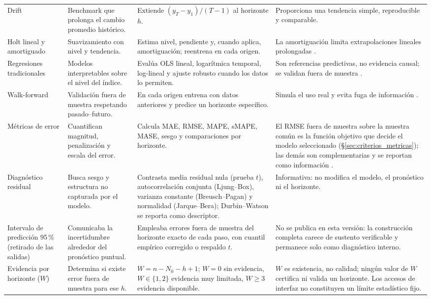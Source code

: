 \documentclass[12pt,letterpaper]{article}
\providecommand{\parencite}{\citep}
\begin{document}
\begin{landscape}
\begin{table}[H]
\begin{adjustbox}{max width=\linewidth,max totalheight=0.84\textheight}
\begin{tabularx}{\linewidth}{@{}p{3.1cm}YYY@{}}
Drift & Benchmark que prolonga el cambio promedio histórico. & Extiende \((y_T-y_1)/(T-1)\) al horizonte \(h\). & Proporciona una tendencia simple, reproducible y comparable. \\
Holt lineal y amortiguado & Suavizamiento con nivel y tendencia. & Estima nivel, pendiente y, cuando aplica, amortiguación; reentrena en cada origen. & La amortiguación limita extrapolaciones lineales prolongadas \parencite{holt1957,gardner_mckenzie1985}. \\
Regresiones tradicionales & Modelos interpretables sobre el nivel del índice. & Evalúa OLS lineal, logarítmica temporal, log-lineal y ajuste robusto cuando los datos lo permiten. & Son referencias predictivas, no evidencia causal; se validan fuera de muestra \parencite{granger_newbold1974,huber1964}. \\
Walk-forward & Validación fuera de muestra respetando pasado--futuro. & En cada origen entrena con datos anteriores y predice un horizonte específico. & Simula el uso real y evita fuga de información \parencite{tashman2000}. \\
Métricas de error & Cuantifican magnitud, penalización y escala del error. & Calcula MAE, RMSE, MAPE, sMAPE, MASE, sesgo y comparaciones por horizonte. & El RMSE fuera de muestra sobre la muestra común es la función objetivo que decide el modelo seleccionado (§\ref{sec:criterios_metricas}); las demás son complementarias y se reportan como información \parencite{hyndman_koehler2006}. \\
Diagnóstico residual & Busca sesgo y estructura no capturada por el modelo. & Contrasta media residual nula (prueba \(t\)), autocorrelación conjunta (Ljung--Box), varianza constante (Breusch--Pagan) y normalidad (Jarque--Bera); Durbin--Watson se reporta como descriptor. & Informativa: no modifica el modelo, el pronóstico ni el horizonte. \\
Intervalo de predicción 95\,\% (retirado de las salidas) & Comunicaba la incertidumbre alrededor del pronóstico puntual. & Empleaba errores fuera de muestra del horizonte exacto de cada paso, con cuantil empírico corregido o respaldo $t$. & No se publica en esta versión: la construcción completa carece de sustento verificable y permanece solo como diagnóstico interno. \\
Evidencia por horizonte (\(W\)) & Determina si existe error fuera de muestra para ese \(h\). & \(W=n-N_0-h+1\); \(W=0\) sin evidencia, \(W\in\{1,2\}\) evidencia muy limitada, \(W\geq3\) evidencia disponible. & \(W\) es existencia, no calidad; ningún valor de \(W\) certifica ni valida un horizonte. Los accesos de interfaz no constituyen un límite estadístico fijo. \\

\end{tabularx}
\end{adjustbox}
\end{table}
\end{landscape}
\end{document}
